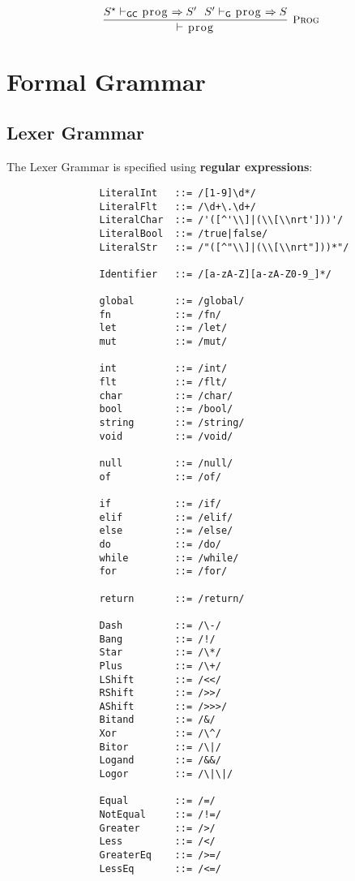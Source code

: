 \documentclass{article}
\newcommand{\code}[1]{\lstinline[columns=fixed]{#1}}
\newcommand{\drmrule}[5]{\frac{#1}{#2\vdash_{\mathsf{#3}}#4}\textsc{\ \small{#5}}}
\newcommand{\ruleapp}[1]{\vdash_{\mathsf{#1}}}
\newcommand{\mc}[1]{\textnormal{\code{#1}}}
\begin{document}
			\begin{align*}
				\drmrule{S^\star \ruleapp{GC} \mc{prog} \Rightarrow S' \ \ S' \ruleapp{G} \mc{prog} \Rightarrow S}{}{}{\mc{prog}}{Prog}
			\end{align*}
		
	\section{Formal Grammar}
	
		\subsection{Lexer Grammar}
		
			The Lexer Grammar is specified using \textbf{regular expressions}:
			
			\begin{verbatim}
				LiteralInt   ::= /[1-9]\d*/
				LiteralFlt   ::= /\d+\.\d+/
				LiteralChar  ::= /'([^'\\]|(\\[\\nrt']))'/
				LiteralBool  ::= /true|false/
				LiteralStr   ::= /"([^"\\]|(\\[\\nrt"]))*"/
				
				Identifier   ::= /[a-zA-Z][a-zA-Z0-9_]*/
				
				global       ::= /global/
				fn           ::= /fn/
				let          ::= /let/
				mut          ::= /mut/
				
				int          ::= /int/
				flt          ::= /flt/
				char         ::= /char/
				bool         ::= /bool/
				string       ::= /string/
				void         ::= /void/
				
				null         ::= /null/
				of           ::= /of/
				
				if           ::= /if/
				elif         ::= /elif/
				else         ::= /else/
				do           ::= /do/
				while        ::= /while/
				for          ::= /for/
				 
				return       ::= /return/
				
				Dash         ::= /\-/
				Bang         ::= /!/
				Star         ::= /\*/
				Plus         ::= /\+/
				LShift       ::= /<</
				RShift       ::= />>/
				AShift       ::= />>>/
				Bitand       ::= /&/
				Xor          ::= /\^/
				Bitor        ::= /\|/
				Logand       ::= /&&/
				Logor        ::= /\|\|/
				
				Equal        ::= /=/
				NotEqual     ::= /!=/
				Greater      ::= />/
				Less         ::= /</
				GreaterEq    ::= />=/
				LessEq       ::= /<=/
				

\end{verbatim}
\end{document}
